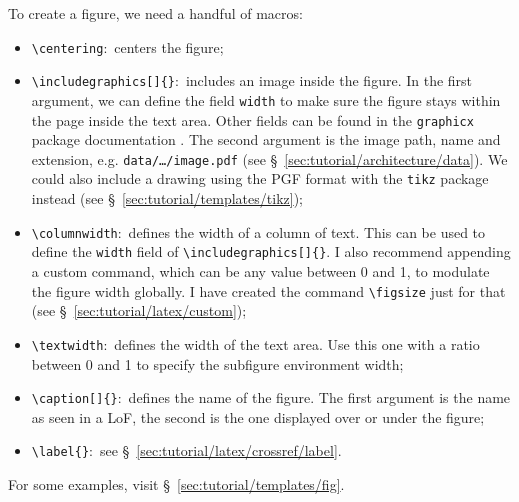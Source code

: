 \noindent To create a figure, we need a handful of \glspl{macro}:
\begin{itemize}
    \item \texttt{\textbackslash{}centering}:~centers the figure;
    \item \texttt{\textbackslash{}includegraphics[]\{\}}:~includes an image inside the figure. In the first \gls{argument}, we can define the field \texttt{width} to make sure the figure stays within the page inside the text area. Other fields can be found in the \texttt{graphicx} \gls{package} documentation \parencite{web:ctan-graphicx}. The second \gls{argument} is the image path, name and extension, e.g. \texttt{data/\ldots/image.pdf} (see \S~\ref{sec:tutorial/architecture/data}). We could also include a drawing using the \gls{PGF} format with the \texttt{tikz} package instead (see \S~\ref{sec:tutorial/templates/tikz});
    \item \texttt{\textbackslash{}columnwidth}:~defines the width of a column of text. This can be used to define the \texttt{width} field of \texttt{\textbackslash{}includegraphics[]\{\}}. I also recommend appending a custom \gls{command}, which can be any value between 0 and 1, to modulate the figure width globally. I have created the \gls{command} \texttt{\textbackslash{}figsize} just for that (see \S~\ref{sec:tutorial/latex/custom});
    \item \texttt{\textbackslash{}textwidth}:~defines the width of the text area. Use this one with a ratio between 0 and 1 to specify the subfigure \gls{environment} width;
    \item \texttt{\textbackslash{}caption[]\{\}}:~defines the name of the figure. The first \gls{argument} is the name as seen in a \gls{LoF}, the second is the one displayed over or under the figure;
    \item \texttt{\textbackslash{}label\{\}}:~see \S~\ref{sec:tutorial/latex/crossref/label}.
\end{itemize}

\noindent For some examples, visit \S~\ref{sec:tutorial/templates/fig}.